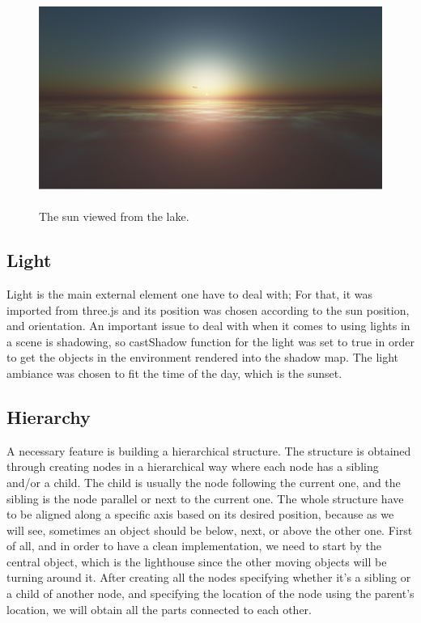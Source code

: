 \documentclass[paper=a4, fontsize=11pt]{scrartcl} %
\numberwithin{equation}{section} %
\numberwithin{figure}{section} %
\numberwithin{table}{section} %
\begin{document}
\begin{figure}[!ht]
\centering
\includegraphics[width=15cm, height=7cm]{sun.png}
\caption{The sun viewed from the lake.}
\label{sun}
\end{figure}
\newpage

\subsection{Light}

Light is the main external element one have to deal with; For that, it was imported from three.js and its position was chosen according to the sun position, and orientation. An important issue to deal with when it comes to using lights in a scene is shadowing, so castShadow function for the light was set to true in order to get the objects in the environment rendered into the shadow map. The light ambiance was chosen to fit the time of the day, which is the sunset.

\subsection{Hierarchy}

A necessary feature is building a hierarchical structure. The structure is obtained through creating nodes in a hierarchical way where each node has a sibling and/or a child. The child is usually the node following the current one, and the sibling is the node parallel or next to the current one. The whole structure have to be aligned along a specific axis based on its desired position, because as we will see, sometimes an object should be below, next, or above the other one. First of all, and in order to have a clean implementation, we need to start by the central object, which is the lighthouse since the other moving objects will be turning around it. After creating all the nodes specifying whether it's a sibling or a child of another node, and specifying the location of the node using the parent's location, we will obtain all the parts connected to each other.
\end{document}

